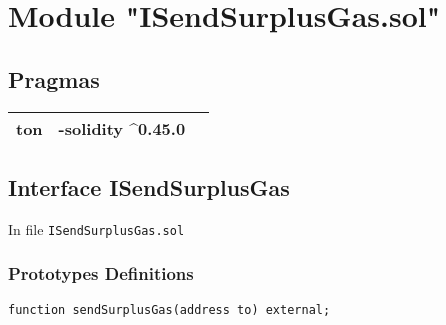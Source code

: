 
\section{Module "ISendSurplusGas.sol"}


\subsection{Pragmas}


\noindent\begin{tabular}{|l|l|p{5cm}|}\hline
ton & -solidity \^{}0.45.0 &\\\hline
\end{tabular}


\subsection{Interface ISendSurplusGas}


In file {\tt ISendSurplusGas.sol}

\subsubsection{Prototypes Definitions}

\vspace{2cm}

\begin{lstlisting}[firstnumber=4]
    function sendSurplusGas(address to) external;
\end{lstlisting}
